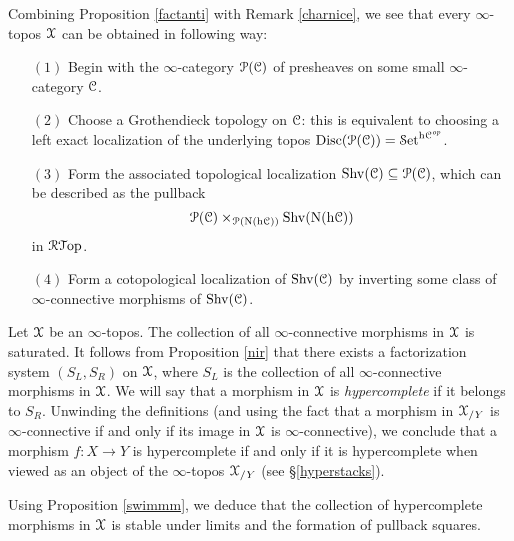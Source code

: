 Combining Proposition \ref{factanti} with Remark \ref{charnice}, we see that every $\infty$-topos $\operatorname{\mathcal{X}}$ can be obtained in following way:
\begin{itemize}
\item[$(1)$] Begin with the $\infty$-category $\operatorname{\mathcal{P}}(\operatorname{\mathcal{C}})$ of presheaves on some small $\infty$-category $\operatorname{\mathcal{C}}$.

\item[$(2)$] Choose a Grothendieck topology on $\operatorname{\mathcal{C}}$: this is equivalent to choosing a 
left exact localization of the underlying topos $\operatorname{Disc}(\operatorname{\mathcal{P}}(\operatorname{\mathcal{C}})) = \operatorname{\mathcal{S}et}^{ \rm{h} \it{\operatorname{\mathcal{C}}^{op}}}$.

\item[$(3)$] Form the associated topological localization $\operatorname{Shv}(\operatorname{\mathcal{C}}) \subseteq \operatorname{\mathcal{P}}(\operatorname{\mathcal{C}})$, which can be described as the pullback 
$$ \operatorname{\mathcal{P}}(\operatorname{\mathcal{C}}) \times_{ \operatorname{\mathcal{P}}( \operatorname{N} ( \rm{h} \it{\operatorname{\mathcal{C}}}) )} \operatorname{Shv}( \operatorname{N} ( \rm{h} \it{\operatorname{\mathcal{C}}} ) )$$
in $\operatorname{\mathcal{R}{\mathcal T}op}$.

\item[$(4)$] Form a cotopological localization of $\operatorname{Shv}(\operatorname{\mathcal{C}})$ by inverting some class
of $\infty$-connective morphisms of $\operatorname{Shv}(\operatorname{\mathcal{C}})$.
\end{itemize}

\begin{remark}\label{comk1}
Let $\operatorname{\mathcal{X}}$ be an $\infty$-topos. The collection of all $\infty$-connective morphisms
in $\operatorname{\mathcal{X}}$ is saturated. It follows from Proposition \ref{nir} that there exists a factorization system
$(S_L, S_R)$ on $\operatorname{\mathcal{X}}$, where $S_L$ is the collection of all $\infty$-connective morphisms in
$\operatorname{\mathcal{X}}$. We will say that a morphism in $\operatorname{\mathcal{X}}$ is {\it hypercomplete} if it belongs to $S_R$.
Unwinding the definitions (and using the fact that a morphism in $\operatorname{\mathcal{X}}_{/Y}$ is $\infty$-connective if and only if its image in $\operatorname{\mathcal{X}}$ is $\infty$-connective), we conclude that a morphism
$f: X \rightarrow Y$ is hypercomplete if and only if it is hypercomplete when viewed as an object of the $\infty$-topos $\operatorname{\mathcal{X}}_{/Y}$ (see \S \ref{hyperstacks}). 

Using Proposition \ref{swimmm}, we deduce that the collection of hypercomplete morphisms in $\operatorname{\mathcal{X}}$ is stable under limits and the formation of pullback squares.
\end{remark}

